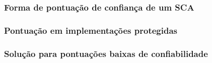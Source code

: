 \subsubsection{Forma de pontuação de confiança de um SCA}

\subsubsection{Pontuação em implementações protegidas}

\subsubsection{Solução para pontuações baixas de confiabilidade}

